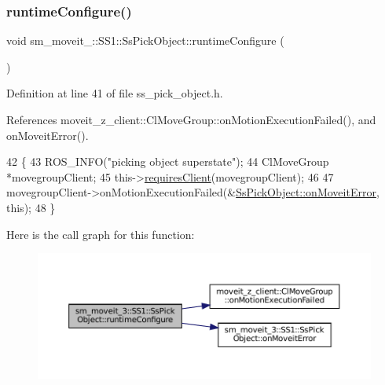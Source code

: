 \subsubsection{\texorpdfstring{runtime\+Configure()}{runtimeConfigure()}}
{\footnotesize\ttfamily void sm\+\_\+moveit\+\_\+::\+S\+S1\+::\+Ss\+Pick\+Object\+::runtime\+Configure (\begin{DoxyParamCaption}{ }\end{DoxyParamCaption})\hspace{0.3cm}{\ttfamily [inline]}}



Definition at line 41 of file ss\+\_\+pick\+\_\+object.\+h.



References moveit\+\_\+z\+\_\+client\+::\+Cl\+Move\+Group\+::on\+Motion\+Execution\+Failed(), and on\+Moveit\+Error().


\begin{DoxyCode}
42     \{
43         ROS\_INFO(\textcolor{stringliteral}{"picking object superstate"});
44         ClMoveGroup *movegroupClient;
45         this->\hyperlink{classsmacc_1_1ISmaccState_a7f95c9f0a6ea2d6f18d1aec0519de4ac}{requiresClient}(movegroupClient);
46 
47         movegroupClient->onMotionExecutionFailed(&\hyperlink{structsm__moveit__3_1_1SS1_1_1SsPickObject_ab2cf544834abb6a7b9032f58c228c12c}{SsPickObject::onMoveitError}, \textcolor{keyword}{
      this});
48     \}
\end{DoxyCode}
Here is the call graph for this function\+:
\nopagebreak
\begin{figure}[H]
\begin{center}
\leavevmode
\includegraphics[width=350pt]{structsm__moveit__3_1_1SS1_1_1SsPickObject_ab6c69d020a7630c4b8a81fc4241a33f0_cgraph}
\end{center}
\end{figure}
\mbox{\label{structsm__moveit__3_1_1SS1_1_1SsPickObject_a877486cbf581fdc5f1383191e0aa67bc}} 
